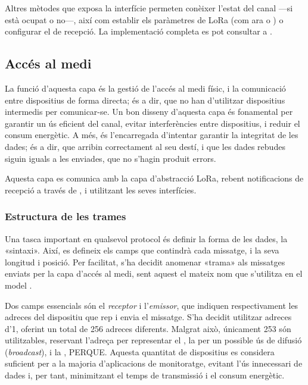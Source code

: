 \documentclass{tfgitic}[2024/07/01]
\begin{document}
Altres mètodes que exposa la interfície permeten conèixer l'estat del canal ---si està ocupat o no---, així com establir els paràmetres de LoRa (com ara  o ) o configurar el  de recepció. La implementació completa es pot consultar a .

\subsection{Accés al medi}
La funció d'aquesta capa és la gestió de l'accés al medi físic, i la comunicació entre dispositius de forma directa; és a dir, que no han d'utilitzar dispositius intermedis per comunicar-se. Un bon disseny d'aquesta capa és fonamental per garantir un ús eficient del canal, evitar interferències entre dispositius, i reduir el consum energètic. A més, és l'encarregada d'intentar garantir la integritat de les dades; és a dir, que arribin correctament al seu destí, i que les dades rebudes siguin iguals a les enviades, que no s'hagin produit errors. 

Aquesta capa es comunica amb la capa d'abstracció LoRa, rebent notificacions de recepció a través de , i utilitzant les seves interfícies.

\subsubsection{Estructura de les trames}
Una tasca important en qualsevol protocol és definir la forma de les dades, la «sintaxi». Així, es defineix els camps que contindrà cada missatge, i la seva longitud i posició. Per facilitat, s'ha decidit anomenar «trama» als missatges enviats per la capa d'accés al medi, sent aquest el mateix nom que s'utilitza en el model .

Dos camps essencials són el \emph{receptor} i l'\emph{emissor}, que indiquen respectivament les adreces del dispositiu que rep i envia el missatge. S'ha decidit utilitzar adreces d'\SI{1}{\byte}, oferint un total de 256 adreces diferents. Malgrat això, únicament 253 són utilitzables, reservant l'adreça  per representar el , la  per un possible ús de difusió (\emph{broadcast}), i la , PERQUE. Aquesta quantitat de dispositius es considera suficient per a la majoria d'aplicacions de monitoratge, evitant l'ús innecessari de dades i, per tant, minimitzant el temps de transmissió i el consum energètic.
\end{document}
